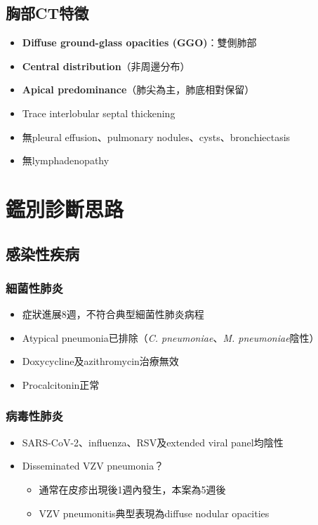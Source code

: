 \documentclass[12pt,a4paper]{article}
\begin{document}
\subsection{胸部CT特徵}
\begin{itemize}
    \item \textbf{Diffuse ground-glass opacities (GGO)}：雙側肺部
    \item \textbf{Central distribution}（非周邊分布）
    \item \textbf{Apical predominance}（肺尖為主，肺底相對保留）
    \item Trace interlobular septal thickening
    \item 無pleural effusion、pulmonary nodules、cysts、bronchiectasis
    \item 無lymphadenopathy
\end{itemize}


\section{鑑別診斷思路}

\subsection{感染性疾病}

\subsubsection{細菌性肺炎}
\begin{itemize}
    \item 症狀進展8週，不符合典型細菌性肺炎病程
    \item Atypical pneumonia已排除（\textit{C. pneumoniae}、\textit{M. pneumoniae}陰性）
    \item Doxycycline及azithromycin治療無效
    \item Procalcitonin正常
\end{itemize}

\subsubsection{病毒性肺炎}
\begin{itemize}
    \item SARS-CoV-2、influenza、RSV及extended viral panel均陰性
    \item Disseminated VZV pneumonia？
    \begin{itemize}
        \item 通常在皮疹出現後1週內發生，本案為5週後
        \item VZV pneumonitis典型表現為diffuse nodular opacities
    \end{itemize}
\end{itemize}
\end{document}
